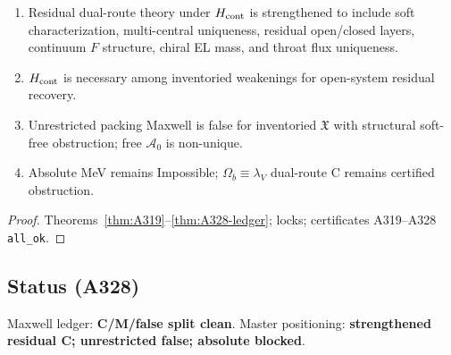 \begin{theorem}
\label{thm:A328-master}
\begin{enumerate}[label=(\roman*)]
\item Residual dual-route theory under $H_{\rm cont}$ is strengthened to include soft characterization, multi-central uniqueness, residual open/closed layers, continuum $F$ structure, chiral EL mass, and throat flux uniqueness.
\item $H_{\rm cont}$ is necessary among inventoried weakenings for open-system residual recovery.
\item Unrestricted packing Maxwell is false for inventoried $\mathfrak{X}$ with structural soft-free obstruction; free $\mathcal{A}_0$ is non-unique.
\item Absolute MeV remains Impossible; $\Omega_b\equiv\lambda_V$ dual-route C remains certified obstruction.
\end{enumerate}
\end{theorem}

\begin{proof}
Theorems~\ref{thm:A319}--\ref{thm:A328-ledger}; locks; certificates A319--A328 \texttt{all\_ok}.
\end{proof}

\subsection*{Status (A328)}
Maxwell ledger: \textbf{C/M/false split clean}. Master positioning: \textbf{strengthened residual C; unrestricted false; absolute blocked}.

